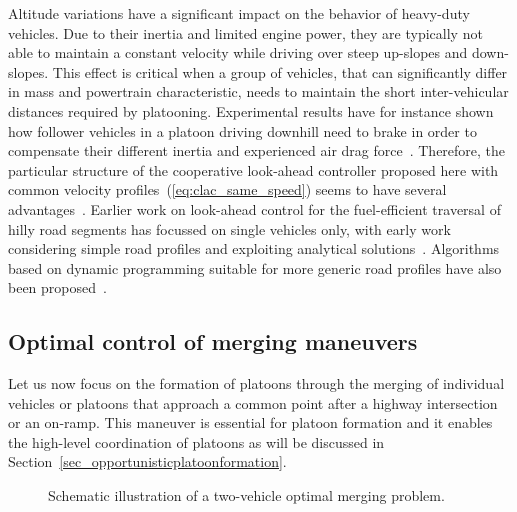 \documentclass[journal]{IEEEtran}
\begin{document}
Altitude variations have a significant impact on the behavior of heavy-duty vehicles. Due to their inertia and limited engine power, they are typically not able to maintain a constant velocity while driving over steep up-slopes and down-slopes. This effect is critical when a group of vehicles, that can significantly differ in mass and powertrain characteristic, needs to maintain the short inter-vehicular distances required by platooning. Experimental results have for instance shown how follower vehicles in a platoon driving downhill need to brake in order to compensate their different inertia and experienced air drag force~\cite{alam_2015b}. Therefore, the particular structure of the cooperative look-ahead controller proposed here with common velocity profiles~(\ref{eq:clac_same_speed}) seems to have several advantages~\cite{turri_2015}. Earlier work on look-ahead control for the fuel-efficient traversal of hilly road segments has focussed on single vehicles only, with early work considering simple road profiles and exploiting analytical solutions~\cite{schwarzkopf_1977,stoicescu1995fuel}. Algorithms based on dynamic programming suitable for more generic road profiles have also been proposed~\cite{hooker1988optimal,monastyrsky1993rapid,hellstrom_2009}.


\subsection{Optimal control of merging maneuvers}\label{sec_merging}
Let us now focus on the formation of platoons through the merging of individual vehicles or platoons that approach a common point after a highway intersection or an on-ramp. This maneuver is essential for platoon formation and it enables the high-level coordination of platoons as will be discussed in Section~\ref{sec_opportunisticplatoonformation}.

\begin{figure}
\begin{center}
\vskip-2mm\caption{Schematic illustration of a two-vehicle optimal merging problem.}
\label{fig_mergingproblem}
\end{center}
\end{figure}
\end{document}
